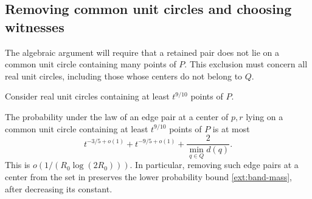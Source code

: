 \subsection{Removing common unit circles and choosing witnesses}

The algebraic argument will require that a retained pair does not lie
on a common unit circle containing many points of \(P\).  This exclusion
must concern all real unit circles, including those whose centers do
not belong to \(Q\).

Consider real unit circles containing at least
\(t^{9/10}\) points of \(P\).

\begin{lemma}\label{ext:circles}
The probability under the law of an edge pair at a center of
\(p,r\) lying on a common unit circle containing at least \(t^{9/10}\) points of \(P\) is at most
\begin{equation}\label{ext:circle-cost}
 t^{-3/5+o(1)}+t^{-9/5+o(1)}+\frac{2}{\min_{q\in Q}d(q)}.
\end{equation}
This is \(o(1/(R_0\log(2R_0)))\).  In particular, removing such edge pairs at a center
from the set in  preserves the lower probability bound
\eqref{ext:band-mass}, after decreasing its constant.
\end{lemma}

